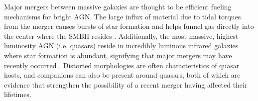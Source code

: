 \documentclass[manuscript]{aastex}
\begin{document}




Major mergers between massive galaxies are thought to be efficient fueling mechanisms for bright AGN. The large influx of material due to tidal torques from the merger causes bursts of star formation and helps funnel gas directly into the center where the SMBH resides \citep[e.g.][]{Richards2006,Reddy2008,Hopkins2010}. Additionally, the most massive, highest-luminosity AGN (i.e. quasars) reside in incredibly luminous infrared galaxies where star formation is abundant, signifying that major mergers may have recently occurred \citep{Treister2012}. Distorted morphologies are often characteristics of quasar hosts, and companions can also be present around quasars, both of which are evidence that strengthen the possibility of a recent merger having affected their lifetimes. 
\end{document}

